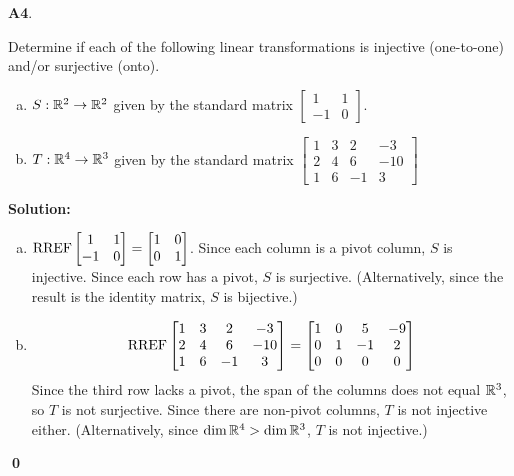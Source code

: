 \documentclass{article}
\newenvironment{problem}[1]
{
  \begin{flushleft}
  \textbf{#1}.
  \ignorespaces
}
{
  \end{flushleft}
}
\newenvironment{solution}
{
  \ignorespaces
  \textbf{Solution:}
}
{
  \ignorespacesafterend
  \begin{flushright}
  {\bfseries \qed}
  \end{flushright}
}
\begin{document}
\begin{problem}{A4}
Determine if each of the following linear transformations is injective (one-to-one) and/or surjective (onto).
\begin{enumerate}[(a)]
\item $S: \mathbb{R}^2 \rightarrow \mathbb{R}^2$ given by the standard matrix $\begin{bmatrix} 1 & 1 \\ -1 & 0 \end{bmatrix}$.
\item $T: \mathbb{R}^4 \rightarrow \mathbb{R}^3$ given by the standard matrix $\begin{bmatrix} 1 & 3 & 2 & -3 \\ 2 & 4 & 6 & -10 \\ 1 & 6 & -1 & 3 \end{bmatrix}$
\end{enumerate}
\end{problem}
\begin{solution}
\begin{enumerate}[(a)]
\item $ \operatorname{RREF}\begin{bmatrix} 1 & 1 \\ -1 & 0 \end{bmatrix}=\begin{bmatrix}1 & 0 \\ 0 & 1 \end{bmatrix}$.  Since each column is a pivot column, $S$ is injective.  Since each row has a pivot, $S$ is surjective.
(Alternatively, since the result is the identity matrix, \(S\) is bijective.)
\item $$\operatorname{RREF}\begin{bmatrix}1 & 3 & 2 & -3 \\ 2 & 4 & 6 & -10 \\ 1 & 6 & -1 & 3 \end{bmatrix} = \begin{bmatrix} 1 & 0 & 5 & -9 \\ 0 & 1 & -1 & 2 \\ 0 & 0 & 0 & 0\end{bmatrix}$$
Since the third row lacks a pivot, the span of the columns does not equal \(\mathbb{R}^3\), so \(T\) is not surjective.  Since there are non-pivot columns, \(T\) is not injective either.
(Alternatively, since $\dim \mathbb{R}^4 > \dim \mathbb{R}^3$, $T$ is not injective.)
\end{enumerate}
\end{solution}
\end{document}
